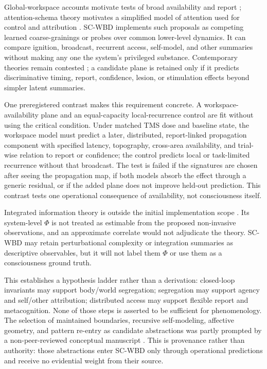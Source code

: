 Global-workspace accounts motivate tests of broad availability and report
\citep{baars1988,dehaene2001}; attention-schema theory motivates a simplified
model of attention used for control and attribution
\citep{graziano2015}. SC-WBD implements such proposals as competing learned
coarse-grainings or probes over common lower-level dynamics. It can compare
ignition, broadcast, recurrent access, self-model, and other summaries without
making any one the system's privileged substance. Contemporary theories
remain contested \citep{sethbayne2022}; a candidate plane is retained only if
it predicts discriminative timing, report, confidence, lesion, or stimulation
effects beyond simpler latent summaries.

One preregistered contrast makes this requirement concrete. A
workspace-availability plane and an equal-capacity local-recurrence control are
fit without using the critical condition. Under matched TMS dose and baseline
state, the workspace model must predict a later, distributed, report-linked
propagation component with specified latency, topography, cross-area
availability, and trial-wise relation to report or confidence; the control
predicts local or task-limited recurrence without that broadcast. The test is
failed if the signatures are chosen after seeing the propagation map, if both
models absorb the effect through a generic residual, or if the added plane
does not improve held-out prediction. This contrast tests one operational
consequence of availability, not consciousness itself.

Integrated information theory is outside the initial implementation scope
\citep{tononi2016}. Its system-level \(\Phi\) is not treated as estimable from
the proposed non-invasive observations, and an approximate correlate would
not adjudicate the theory. SC-WBD may retain perturbational complexity or
integration summaries as descriptive observables, but it will not label them
\(\Phi\) or use them as a consciousness ground truth.

This establishes a hypothesis ladder rather than a derivation:
closed-loop invariants may support body/world segregation; segregation may
support agency and self/other attribution; distributed access may support
flexible report and metacognition. None of those steps is asserted to be
sufficient for phenomenology. The selection of maintained boundaries,
recursive self-modeling, affective geometry, and pattern re-entry as candidate
abstractions was partly prompted by a non-peer-reviewed conceptual manuscript
\citep{valdezshape2026}. This is provenance rather than authority: those
abstractions enter SC-WBD only through operational predictions and receive no
evidential weight from their source.

